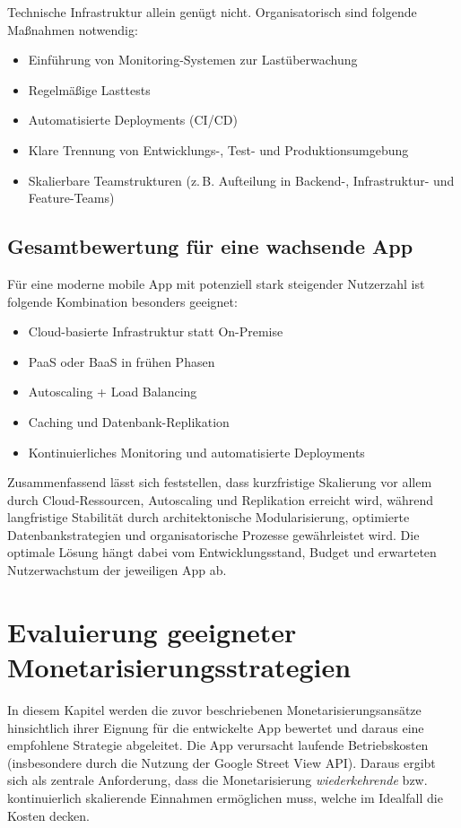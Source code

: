 Technische Infrastruktur allein genügt nicht. Organisatorisch sind folgende Maßnahmen notwendig:

\begin{itemize}
\item Einführung von Monitoring-Systemen zur Lastüberwachung
\item Regelmäßige Lasttests
\item Automatisierte Deployments (CI/CD)
\item Klare Trennung von Entwicklungs-, Test- und Produktionsumgebung
\item Skalierbare Teamstrukturen (z.\,B. Aufteilung in Backend-, Infrastruktur- und Feature-Teams)
\end{itemize}

\subsection*{\textbf{Gesamtbewertung für eine wachsende App}}

Für eine moderne mobile App mit potenziell stark steigender Nutzerzahl ist folgende Kombination besonders geeignet:

\begin{itemize}
\item Cloud-basierte Infrastruktur statt On-Premise
\item PaaS oder BaaS in frühen Phasen
\item Autoscaling + Load Balancing
\item Caching und Datenbank-Replikation
\item Kontinuierliches Monitoring und automatisierte Deployments
\end{itemize}

Zusammenfassend lässt sich feststellen, dass kurzfristige Skalierung vor allem durch Cloud-Ressourcen, Autoscaling und Replikation erreicht wird, während langfristige Stabilität durch architektonische Modularisierung, optimierte Datenbankstrategien und organisatorische Prozesse gewährleistet wird. Die optimale Lösung hängt dabei vom Entwicklungsstand, Budget und erwarteten Nutzerwachstum der jeweiligen App ab.

\section{Evaluierung geeigneter Monetarisierungsstrategien}
In diesem Kapitel werden die zuvor beschriebenen Monetarisierungsansätze hinsichtlich ihrer Eignung für die entwickelte App bewertet und daraus eine empfohlene Strategie abgeleitet. Die App verursacht laufende Betriebskosten (insbesondere durch die Nutzung der Google Street View API). Daraus ergibt sich als zentrale Anforderung, dass die Monetarisierung \textit{wiederkehrende} bzw. kontinuierlich skalierende Einnahmen ermöglichen muss, welche im Idealfall die Kosten decken.

